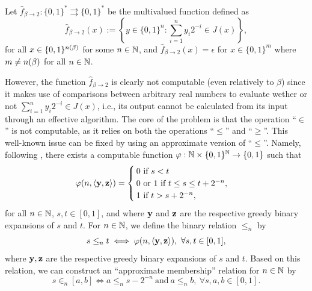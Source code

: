 \begin{definition}\label{def:noncomputable multivalued function converting from base beta to base 2}
    Let $\hat f_{\beta \to 2} : \{0,1\}^\ast \rightrightarrows \{0,1\}^\ast$ be the multivalued function defined as 
\begin{equation}\label{eq:main:def:noncomputable multivalued function converting from base beta to base 2}
    \hat f_{\beta \to 2}(x) := \left\{ y \in \{0,1\}^n :  \sum_{i=1}^{n} y_i 2^{-i} \in J(x)\right\},
\end{equation}
for all $x \in \{0,1\}^{n(\beta)}$ for some $n \in \mathbb{N}$, and $\hat f_{\beta \to 2}(x) = \epsilon$ for $x \in \{0,1\}^m$ where $m \neq n(\beta)$ for all $n \in \mathbb{N}$.
\end{definition} 
However, the function $\hat f_{\beta \to 2}$ is clearly not computable (even relatively to $\beta$) since it makes use of comparisons between arbitrary real numbers to evaluate wether or not $\sum_{i=1}^{n} y_i 2^{-i} \in J(x)$, i.e., its output cannot be calculated from its input through an effective algorithm. The core of the problem is that the operation ``$\in$'' is not computable, as it relies on both the operations ``$\leq$'' and ``$\geq$''. This well-known issue can be fixed by using an approximate version of ``$\leq$''. Namely, following \cite[Section 4.1, p79-80]{brattka2018ComputabilityAnalysis}, there exists a computable function $\varphi : \mathbb{N} \times \{0,1\}^{\mathbb{N}} \to \{0,1\}$ such that
\begin{equation}
    \varphi(n, \langle {\bf y}, {\bf z} \rangle) = \begin{cases}
        0 \ \text{if} \ s < t\\
        0 \ \text{or} \ 1 \ \text{if} \ t \leq s \leq t + 2^{-n},\\
        1 \ \text{if} \ t > s + 2^{-n},
    \end{cases}
\end{equation}
for all $n \in \mathbb{N}$, $s,t \in [0,1]$, and where ${\bf y}$ and ${\bf z}$ are the respective greedy binary expansions of $s$ and $t$. For $n \in \mathbb{N}$, we define the binary relation $\leq_n$ by 
\begin{equation}
    s \leq_n t \iff \varphi(n , \langle {\bf y}, {\bf z} \rangle), \ \forall s,t \in [0,1],
\end{equation}
where ${\bf y},{\bf z}$ are the respective greedy binary expansions of $s$ and $t$. Based on this relation, we can construct an ``approximate membership'' relation for $n \in \mathbb{N}$ by 
\begin{equation}
    s \in_n [a,b] \iff a \leq_n s - 2^{-n} \ \text{and} \ a\leq_n b, \ \forall s,a,b \in [0,1].
\end{equation}
